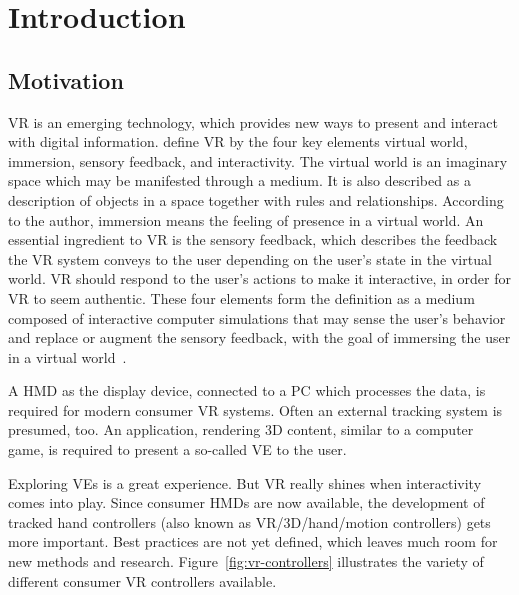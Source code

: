 \chapter{Introduction}\label{chapter:introduction}

\section{Motivation}\label{section:motivation}

\ac{VR} is an emerging technology, which provides new ways to present and interact with digital information. \citeauthor{Sherman.2003} define \ac{VR} by the four key elements virtual world, immersion, sensory feedback, and interactivity. The virtual world is an imaginary space which may be manifested through a medium. It is also described as a description of objects in a space together with rules and relationships. According to the author, immersion means the feeling of presence in a virtual world. An essential ingredient to \ac{VR} is the sensory feedback, which describes the feedback the \ac{VR} system conveys to the user depending on the user's state in the virtual world. \ac{VR} should respond to the user's actions to make it interactive, in order for \ac{VR} to seem authentic.
These four elements form the definition as a medium composed of interactive computer simulations that may sense the user's behavior and replace or augment the sensory feedback, with the goal of immersing the user in a virtual world~\cite[6-12]{Sherman.2003}.

A \ac{HMD} as the display device, connected to a \ac{PC} which processes the data, is required for modern consumer \ac{VR} systems. Often an external tracking system is presumed, too. An application, rendering \ac{3D} content, similar to a computer game, is required to present a so-called \ac{VE} to the user.

Exploring \acp{VE} is a great experience. But \ac{VR} really shines when interactivity comes into play. Since consumer \acp{HMD} are now available, the development of tracked hand controllers (also known as \ac{VR}/\ac{3D}/hand/motion controllers) gets more important.
Best practices are not yet defined, which leaves much room for new methods and research. Figure~\ref{fig:vr-controllers} illustrates the variety of different consumer \ac{VR} controllers available.


